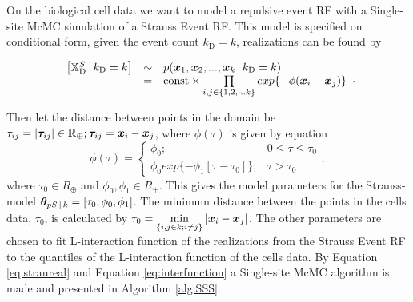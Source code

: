 \section{}
\label{sec:problem4}

On the biological cell data we want to model a repulsive event RF with a Single-site McMC simulation of a Strauss Event RF. This model is specified on conditional form, given the event count $k_\textrm{D} = k$, realizations can be found by
%

\begin{equation}
    \begin{array}{rcl}
        \left[\mathbb{X}_\textrm{D}^S \, | \, k_\textrm{D} = k\right] & \sim & p(\bm{x}_1,\bm{x}_2,...,\bm{x}_k \, | \, k_\textrm{D} = k) \\
         & = & \mathrm{const} \times \prod\limits_{i,j\in \{1,2,...k\}} exp\{-\phi(\bm{x}_i-\bm{x}_j)\}
    \end{array}.
    \label{eq:straureal}
\end{equation}
%

Then let the distance between points in the domain be $\tau_{ij} = |\bm{\tau}_{ij}| \in \mathbb{R}_\oplus; \bm{\tau}_{ij} = \bm{x}_i - \bm{x}_j$, where $\phi(\tau)$ is given by equation 
\begin{equation}
    \phi(\tau) = \begin{cases}
                    \phi_0; & 0 \leq \tau \leq \tau_0\\
                    \phi_0 exp\{-\phi_1[\tau-\tau_0]\}; & \tau > \tau_0
                \end{cases},
    \label{eq:interfunction}
\end{equation}
where $\tau_0 \in R_\oplus$ and $\phi_0,\phi_1 \in R_+$. This gives the model parameters for the Strauss-model $\bm{\theta} _{pS\, | \, k} = [\tau_0,\phi_0,\phi_1]$. The minimum distance between the points in the cells data, $\tau_0$, is calculated by $\tau_0 = \min\limits_{\{i,j\in k;i\neq j\}} |\bm{x}_i-\bm{x}_j|$. The other parameters are chosen to fit L-interaction function of the realizations from the Strauss Event RF to the quantiles of the L-interaction function of the cells data. By Equation \eqref{eq:straureal} and Equation \eqref{eq:interfunction} a Single-site McMC algorithm is made and presented in Algorithm \ref{alg:SSS}. 


